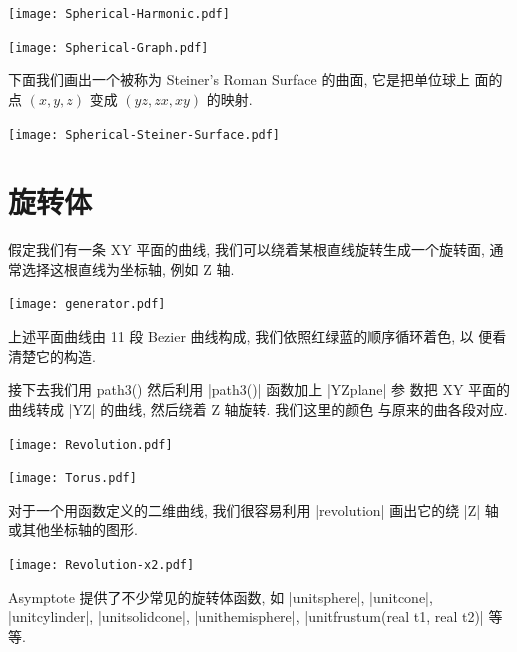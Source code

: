 \documentclass[nofonts,CJKnormalspaces]{ctexbook}[2009/05/20]
\begin{document}
\begin{center}\texttt{[image: Spherical-Harmonic.pdf]}\end{center}%


\begin{center}\texttt{[image: Spherical-Graph.pdf]}\end{center}%



下面我们画出一个被称为 Steiner's Roman Surface 的曲面, 它是把单位球上
面的点 $(x,y,z)$ 变成 $(yz,zx,xy)$ 的映射.
\begin{center}\texttt{[image: Spherical-Steiner-Surface.pdf]}\end{center}%


\section{旋转体}
假定我们有一条 XY 平面的曲线, 我们可以绕着某根直线旋转生成一个旋转面,
通常选择这根直线为坐标轴, 例如 Z 轴.
\begin{center}\texttt{[image: generator.pdf]}\end{center}%

上述平面曲线由 11 段 Bezier 曲线构成, 我们依照红绿蓝的顺序循环着色, 以
便看清楚它的构造.

接下去我们用 path3() 然后利用 |path3()| 函数加上 |YZplane| 参
数把 XY 平面的曲线转成 |YZ| 的曲线, 然后绕着 Z 轴旋转. 我们这里的颜色
与原来的曲各段对应.
\begin{center}\texttt{[image: Revolution.pdf]}\end{center}%


\begin{center}\texttt{[image: Torus.pdf]}\end{center}%

对于一个用函数定义的二维曲线, 我们很容易利用 |revolution| 画出它的绕
|Z| 轴或其他坐标轴的图形.
\begin{center}\texttt{[image: Revolution-x2.pdf]}\end{center}%


Asymptote 提供了不少常见的旋转体函数, 如 |unitsphere|, |unitcone|,
|unitcylinder|, |unitsolidcone|, |unithemisphere|,
|unitfrustum(real t1, real t2)| 等等.
\end{document}
